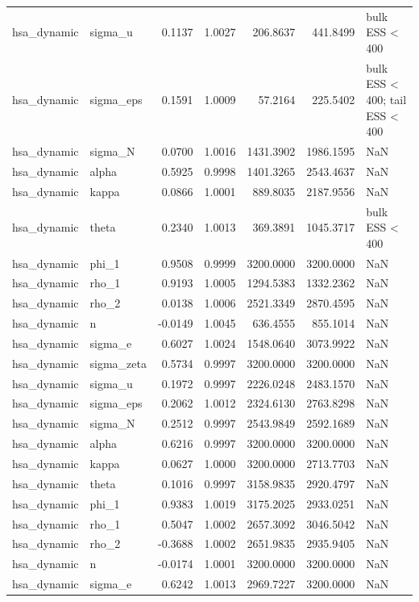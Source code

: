 \begin{tabular}{llrrrrl}
hsa\_dynamic & sigma\_u & 0.1137 & 1.0027 & 206.8637 & 441.8499 & bulk ESS < 400 \\
hsa\_dynamic & sigma\_eps & 0.1591 & 1.0009 & 57.2164 & 225.5402 & bulk ESS < 400; tail ESS < 400 \\
hsa\_dynamic & sigma\_N & 0.0700 & 1.0016 & 1431.3902 & 1986.1595 & NaN \\
hsa\_dynamic & alpha & 0.5925 & 0.9998 & 1401.3265 & 2543.4637 & NaN \\
hsa\_dynamic & kappa & 0.0866 & 1.0001 & 889.8035 & 2187.9556 & NaN \\
hsa\_dynamic & theta & 0.2340 & 1.0013 & 369.3891 & 1045.3717 & bulk ESS < 400 \\
hsa\_dynamic & phi\_1 & 0.9508 & 0.9999 & 3200.0000 & 3200.0000 & NaN \\
hsa\_dynamic & rho\_1 & 0.9193 & 1.0005 & 1294.5383 & 1332.2362 & NaN \\
hsa\_dynamic & rho\_2 & 0.0138 & 1.0006 & 2521.3349 & 2870.4595 & NaN \\
hsa\_dynamic & n & -0.0149 & 1.0045 & 636.4555 & 855.1014 & NaN \\
hsa\_dynamic & sigma\_e & 0.6027 & 1.0024 & 1548.0640 & 3073.9922 & NaN \\
hsa\_dynamic & sigma\_zeta & 0.5734 & 0.9997 & 3200.0000 & 3200.0000 & NaN \\
hsa\_dynamic & sigma\_u & 0.1972 & 0.9997 & 2226.0248 & 2483.1570 & NaN \\
hsa\_dynamic & sigma\_eps & 0.2062 & 1.0012 & 2324.6130 & 2763.8298 & NaN \\
hsa\_dynamic & sigma\_N & 0.2512 & 0.9997 & 2543.9849 & 2592.1689 & NaN \\
hsa\_dynamic & alpha & 0.6216 & 0.9997 & 3200.0000 & 3200.0000 & NaN \\
hsa\_dynamic & kappa & 0.0627 & 1.0000 & 3200.0000 & 2713.7703 & NaN \\
hsa\_dynamic & theta & 0.1016 & 0.9997 & 3158.9835 & 2920.4797 & NaN \\
hsa\_dynamic & phi\_1 & 0.9383 & 1.0019 & 3175.2025 & 2933.0251 & NaN \\
hsa\_dynamic & rho\_1 & 0.5047 & 1.0002 & 2657.3092 & 3046.5042 & NaN \\
hsa\_dynamic & rho\_2 & -0.3688 & 1.0002 & 2651.9835 & 2935.9405 & NaN \\
hsa\_dynamic & n & -0.0174 & 1.0001 & 3200.0000 & 3200.0000 & NaN \\
hsa\_dynamic & sigma\_e & 0.6242 & 1.0013 & 2969.7227 & 3200.0000 & NaN \\

\end{tabular}
